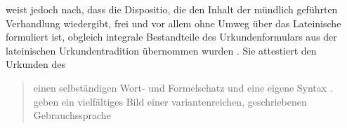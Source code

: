 % 
%
\citet{schulze2011} weist jedoch nach, dass die Dispositio, die den Inhalt der
mündlich geführten Verhandlung wiedergibt, frei und vor allem ohne Umweg über
das Lateinische formuliert ist, obgleich integrale Bestandteile des
Urkundenformulars aus der lateinischen Urkundentradition übernommen wurden
\autocite[13, 25--38]{schulze2011}. Sie attestiert den Urkunden des
\CAO{} \blockcquote[3]{schulze1994}{einen selbständigen Wort- und
Formelschatz und eine eigene Syntax \textelp{}.  geben
ein vielfältiges Bild einer variantenreichen, geschriebenen
Gebrauchs\-sprache}.

